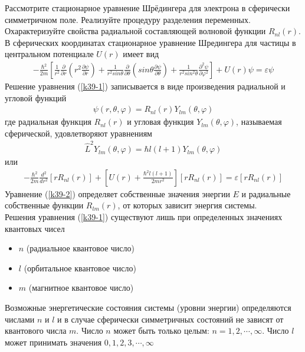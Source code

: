 \documentclass[__main__.tex]{subfiles}
\begin{document}
Рассмотрите стационарное уравнение Шрёдингера для электрона в сферически симметричном поле. Реализуйте процедуру разделения переменных. Охарактеризуйте свойства радиальной составляющей волновой функции $R_{nl}(r)$.\\

В сферических координатах стационарное уравнение Шредингера для частицы в центральном потенциале $U(r)$ имеет вид
\begin{gather}
    \label{k39-1}
    -\frac{\hbar^2}{2m}\left[\frac{1}{r^2}\frac{\partial}{\partial r}\left(r^2\frac{\partial \psi}{\partial r}\right)+\frac{1}{r^2sin\theta}\frac{\partial}{\partial\theta}\left(sin\theta\frac{\partial \psi}{\partial \theta}\right)+\frac{1}{r^2sin^2\theta}\frac{\partial^2\psi}{\partial \varphi^2}\right]+U(r)\psi = \varepsilon\psi
\end{gather}
Решение уравнения (\ref{k39-1}) записывается в виде произведения радиальной и угловой функций
\begin{gather*}
    \psi(r,\theta,\varphi)=R_{nl}(r)Y_{lm}(\theta,\varphi)
\end{gather*}
где радиальная функция $R_{nl}(r)$ и угловая функция $Y_{lm}(\theta,\varphi)$, называемая сферической, удовлетворяют уравнениям
\begin{gather*}
    \hat{L}^2Y_{lm}(\theta,\varphi) = \hbar l(l+1)Y_{lm}(\theta,\varphi)
\end{gather*}
или
\begin{gather}
    \label{k39-2}
    -\frac{\hbar^2}{2m}\frac{d^2}{dr^2}\left[rR_{nl}(r)\right]+\left[U(r)+\frac{\hbar^2 l(l+1)}{2mr^2}\right]\left[r R_{nl}(r)\right] = \varepsilon\left[rR_{nl}(r)\right]
\end{gather}
Уравнение (\ref{k39-2}) определяет собственные значения энергии $E$ и радиальные собственные функции $R_{lm}(r)$, от которых зависит энергия системы.\\
Решения уравнения (\ref{k39-1}) существуют лишь при определенных значениях квантовых чисел
\begin{itemize}
    \item $n$ (радиальное квантовое число)
    \item $l$ (орбитальное квантовое число)
    \item $m$ (магнитное квантовое число)
\end{itemize}
Возможные энергетические состояния системы (уровни энергии) определяются числами $n$ и $l$ и в случае сферически симметричных состояний не зависят от квантового числа $m$. Число $n$ может быть только целым: $n=1,2,\cdots,\infty$. Число $l$ может принимать значения $0,1,2,3,\cdots,\infty$
\end{document}
